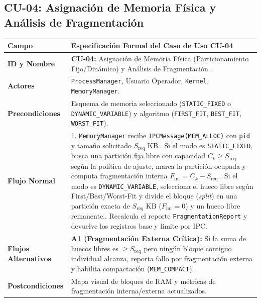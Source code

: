 \documentclass[10pt,twocolumn,letterpaper]{article}
\begin{document}
\subsection{CU-04: Asignaci\'on de Memoria F\'isica y An\'alisis de Fragmentaci\'on}
\begin{table}[!htb]
\centering
\scriptsize
\renewcommand{\arraystretch}{1.12}
\begin{tabularx}{\columnwidth}{L{2.1cm} Y}
\toprule
\textbf{Campo} & \textbf{Especificaci\'on Formal del Caso de Uso CU-04} \\
\midrule
\textbf{ID y Nombre} & \textbf{CU-04:} Asignaci\'on de Memoria F\'isica (Particionamiento Fijo/Din\'amico) y An\'alisis de Fragmentaci\'on. \\
\textbf{Actores} & \texttt{ProcessManager}, Usuario Operador, \texttt{Kernel}, \texttt{MemoryManager}. \\
\textbf{Precondiciones} & Esquema de memoria seleccionado (\texttt{STATIC\_FIXED} o \texttt{DYNAMIC\_VARIABLE}) y algoritmo (\texttt{FIRST\_FIT}, \texttt{BEST\_FIT}, \texttt{WORST\_FIT}). \\
\textbf{Flujo Normal} & 1. \texttt{MemoryManager} recibe \texttt{IPCMessage(MEM\_ALLOC)} con \texttt{pid} y tama\~no solicitado $S_{\text{req}}$ KB.. Si el modo es \texttt{STATIC\_FIXED}, busca una partici\'on fija libre con capacidad $C_k \ge S_{\text{req}}$ seg\'un la pol\'itica de ajuste, marca la partici\'on ocupada y computa fragmentaci\'on interna $F_{\text{int}} = C_k - S_{\text{req}}$.. Si el modo es \texttt{DYNAMIC\_VARIABLE}, selecciona el hueco libre seg\'un First/Best/Worst-Fit y divide el bloque (\textit{split}) en una partici\'on exacta de $S_{\text{req}}$ KB ($F_{\text{int}} = 0$) y un hueco libre remanente.. Recalcula el reporte \texttt{FragmentationReport} y devuelve los registros base y l\'imite por IPC. \\
\textbf{Flujos Alternativos} & \textbf{A1 (Fragmentaci\'on Externa Cr\'itica):} Si la suma de huecos libres es $\ge S_{\text{req}}$ pero ning\'un bloque contiguo individual alcanza, reporta fallo por fragmentaci\'on externa y habilita compactaci\'on (\texttt{MEM\_COMPACT}). \\
\textbf{Postcondiciones} & Mapa visual de bloques de RAM y m\'etricas de fragmentaci\'on interna/externa actualizados. \\
\bottomrule
\end{tabularx}
\end{table}
\end{document}
